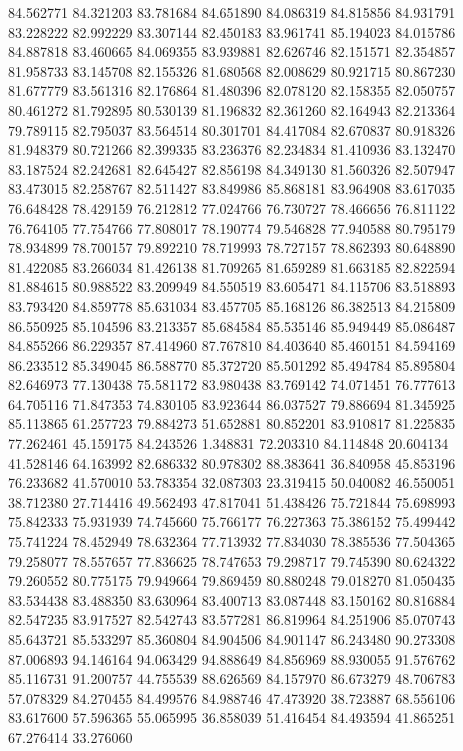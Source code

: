 84.562771
84.321203
83.781684
84.651890
84.086319
84.815856
84.931791
83.228222
82.992229
83.307144
82.450183
83.961741
85.194023
84.015786
84.887818
83.460665
84.069355
83.939881
82.626746
82.151571
82.354857
81.958733
83.145708
82.155326
81.680568
82.008629
80.921715
80.867230
81.677779
83.561316
82.176864
81.480396
82.078120
82.158355
82.050757
80.461272
81.792895
80.530139
81.196832
82.361260
82.164943
82.213364
79.789115
82.795037
83.564514
80.301701
84.417084
82.670837
80.918326
81.948379
80.721266
82.399335
83.236376
82.234834
81.410936
83.132470
83.187524
82.242681
82.645427
82.856198
84.349130
81.560326
82.507947
83.473015
82.258767
82.511427
83.849986
85.868181
83.964908
83.617035
76.648428
78.429159
76.212812
77.024766
76.730727
78.466656
76.811122
76.764105
77.754766
77.808017
78.190774
79.546828
77.940588
80.795179
78.934899
78.700157
79.892210
78.719993
78.727157
78.862393
80.648890
81.422085
83.266034
81.426138
81.709265
81.659289
81.663185
82.822594
81.884615
80.988522
83.209949
84.550519
83.605471
84.115706
83.518893
83.793420
84.859778
85.631034
83.457705
85.168126
86.382513
84.215809
86.550925
85.104596
83.213357
85.684584
85.535146
85.949449
85.086487
84.855266
86.229357
87.414960
87.767810
84.403640
85.460151
84.594169
86.233512
85.349045
86.588770
85.372720
85.501292
85.494784
85.895804
82.646973
77.130438
75.581172
83.980438
83.769142
74.071451
76.777613
64.705116
71.847353
74.830105
83.923644
86.037527
79.886694
81.345925
85.113865
61.257723
79.884273
51.652881
80.852201
83.910817
81.225835
77.262461
45.159175
84.243526
1.348831
72.203310
84.114848
20.604134
41.528146
64.163992
82.686332
80.978302
88.383641
36.840958
45.853196
76.233682
41.570010
53.783354
32.087303
23.319415
50.040082
46.550051
38.712380
27.714416
49.562493
47.817041
51.438426
75.721844
75.698993
75.842333
75.931939
74.745660
75.766177
76.227363
75.386152
75.499442
75.741224
78.452949
78.632364
77.713932
77.834030
78.385536
77.504365
79.258077
78.557657
77.836625
78.747653
79.298717
79.745390
80.624322
79.260552
80.775175
79.949664
79.869459
80.880248
79.018270
81.050435
83.534438
83.488350
83.630964
83.400713
83.087448
83.150162
80.816884
82.547235
83.917527
82.542743
83.577281
86.819964
84.251906
85.070743
85.643721
85.533297
85.360804
84.904506
84.901147
86.243480
90.273308
87.006893
94.146164
94.063429
94.888649
84.856969
88.930055
91.576762
85.116731
91.200757
44.755539
88.626569
84.157970
86.673279
48.706783
57.078329
84.270455
84.499576
84.988746
47.473920
38.723887
68.556106
83.617600
57.596365
55.065995
36.858039
51.416454
84.493594
41.865251
67.276414
33.276060
